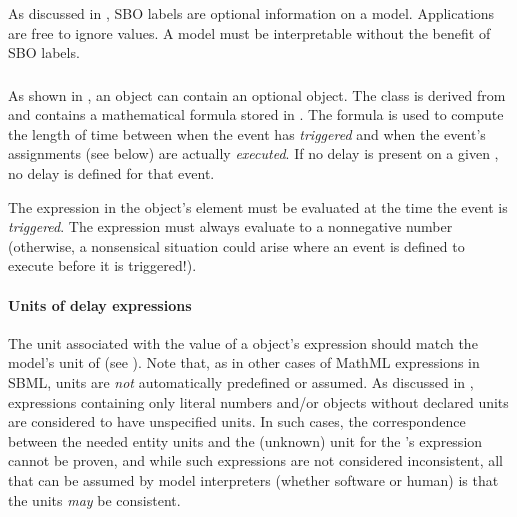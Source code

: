 As discussed in , SBO labels are optional
information on a model.  Applications are free to ignore
 values.  A model must be interpretable without the
benefit of SBO labels.


\subsubsection{}
\label{sec:event-delay}

As shown in , an \Event object can contain
an optional \Delay object.  The \Delay class is derived from
\SBase and contains a mathematical formula stored in .
The formula is used to compute the length of time between when the
event has \emph{triggered} and when the event's assignments (see
below) are actually \emph{executed}.  If no delay is present on a
given \Event, no delay is defined for that event.


The expression in the \Delay object's  element must be
evaluated at the time the event is \emph{triggered}.  The expression
must always evaluate to a nonnegative number (otherwise, a
nonsensical situation could arise where an event is defined to
execute before it is triggered!).


\paragraph{Units of delay expressions}

The unit associated with the value of a \Delay object's
 expression should match the model's unit of
 (see ).  Note
that, as in other cases of MathML expressions in SBML, units are
\emph{not} automatically predefined or assumed.  As discussed in
, expressions containing only
literal numbers and/or \Parameter objects without declared units
are considered to have unspecified units.  In such cases, the
correspondence between the needed entity units and the (unknown)
unit for the \Delay's  expression cannot be proven,
and while such expressions are not considered inconsistent, all
that can be assumed by model interpreters (whether software or
human) is that the units \emph{may} be consistent.

